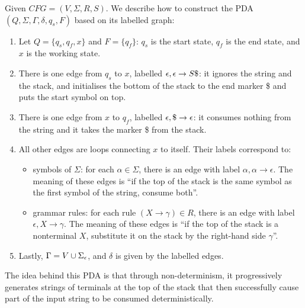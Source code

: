 \begin{code}\label{cfg2pda}
Given $CFG = (V,\Sigma,R,S)$. We describe how to construct the PDA $(Q,\Sigma,\Gamma,\delta,q_s,F)$ based on its labelled graph:
\begin{enumerate}
	\item Let $Q = \{q_s, q_f, x\}$ and $F = \{q_f\}$: $q_s$ is the start state, $q_f$ is the end state, and $x$ is the working state.
	
	\item There is one edge from $q_s$ to $x$, labelled $\eps,\eps\to S\$$: it ignores the string and the stack, and initialises the bottom of the stack to the end marker \$ and puts the start symbol on top.
	
	\item There is one edge from $x$ to $q_f$, labelled $\epsilon,\$\to\epsilon$: it consumes nothing from
	  the string and it takes the marker \$ from the stack.
	
	\item All other edges are loops connecting $x$ to itself. Their labels correspond to:
		\begin{itemize}	
			\item symbols of $\Sigma$: for each $\alpha \in \Sigma$, there is
			  an edge with label $\alpha,\alpha \rightarrow \epsilon$. The meaning
			  of these edges is ``if the top of the stack is the same symbol as the
			  first symbol of the string, consume both''.
			
			\item grammar rules: for each rule $(X \rightarrow \gamma) \in R$, there is
			  an edge with label $\epsilon, X \rightarrow \gamma$. The meaning
			  of these edges is ``if the top of the stack is a nonterminal $X$,
			  substitute it on the stack by the right-hand side $\gamma$''.
		\end{itemize}
	\item Lastly, $\Gamma = V \cup \Sigma_\epsilon$, and $\delta$ is given by the labelled edges.
\end{enumerate}
\end{code}
The idea behind this PDA is that through non-determinism, it progressively generates strings of terminals at the top of the stack that then successfully cause part of the input string to be consumed deterministically.
